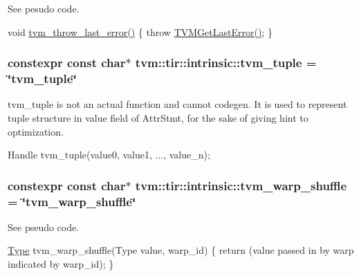See pesudo code. 

void \hyperlink{namespacetvm_1_1tir_1_1intrinsic_ad86e388d33768f6641d60a2e1d142cbb}{tvm\+\_\+throw\+\_\+last\+\_\+error()} \{ throw \hyperlink{c__runtime__api_8h_a775383bcd8c0237e36bdf0c9654d62c3}{T\+V\+M\+Get\+Last\+Error()}; \} 
\subsubsection[{\texorpdfstring{tvm\+\_\+tuple}{tvm_tuple}}]{\setlength{\rightskip}{0pt plus 5cm}constexpr const char$\ast$ tvm\+::tir\+::intrinsic\+::tvm\+\_\+tuple = \char`\"{}tvm\+\_\+tuple\char`\"{}}\hypertarget{namespacetvm_1_1tir_1_1intrinsic_a19fa5d609f7ae416ede0eb14f1b4b165}{}\label{namespacetvm_1_1tir_1_1intrinsic_a19fa5d609f7ae416ede0eb14f1b4b165}


tvm\+\_\+tuple is not an actual function and cannot codegen. It is used to represent tuple structure in value field of Attr\+Stmt, for the sake of giving hint to optimization. 

Handle tvm\+\_\+tuple(value0, value1, ..., value\+\_\+n); 
\subsubsection[{\texorpdfstring{tvm\+\_\+warp\+\_\+shuffle}{tvm_warp_shuffle}}]{\setlength{\rightskip}{0pt plus 5cm}constexpr const char$\ast$ tvm\+::tir\+::intrinsic\+::tvm\+\_\+warp\+\_\+shuffle = \char`\"{}tvm\+\_\+warp\+\_\+shuffle\char`\"{}}\hypertarget{namespacetvm_1_1tir_1_1intrinsic_a1c5047acaa6e7e500840f9a1984f4e58}{}\label{namespacetvm_1_1tir_1_1intrinsic_a1c5047acaa6e7e500840f9a1984f4e58}


See pseudo code. 

\hyperlink{classtvm_1_1Type}{Type} tvm\+\_\+warp\+\_\+shuffle(\+Type value, warp\+\_\+id) \{ return (value passed in by warp indicated by warp\+\_\+id); \} 